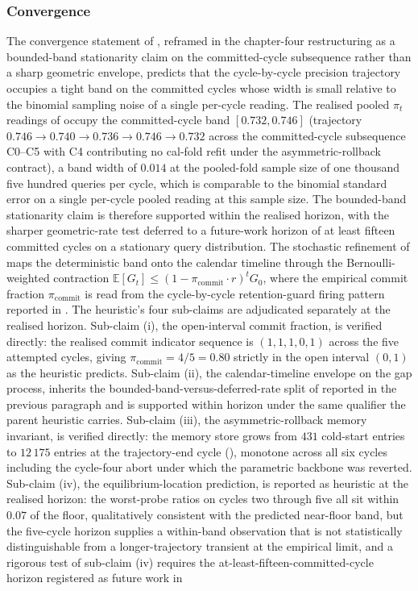 \subsubsection{Convergence}
\label{sec:check-convergence}

The convergence statement of , reframed in the chapter-four restructuring as a bounded-band stationarity claim on the committed-cycle subsequence rather than a sharp geometric envelope, predicts that the cycle-by-cycle precision trajectory occupies a tight band on the committed cycles whose width is small relative to the binomial sampling noise of a single per-cycle reading. The realised pooled $\pi_t$ readings of  occupy the committed-cycle band $[0.732, 0.746]$ (trajectory $0.746 \to 0.740 \to 0.736 \to 0.746 \to 0.732$ across the committed-cycle subsequence C0--C5 with C4 contributing no cal-fold refit under the asymmetric-rollback contract), a band width of $0.014$ at the pooled-fold sample size of one thousand five hundred queries per cycle, which is comparable to the binomial standard error on a single per-cycle pooled reading at this sample size. The bounded-band stationarity claim is therefore supported within the realised horizon, with the sharper geometric-rate test deferred to a future-work horizon of at least fifteen committed cycles on a stationary query distribution. The stochastic refinement of  maps the deterministic band onto the calendar timeline through the Bernoulli-weighted contraction $\mathbb{E}[G_t] \le (1 - \pi_{\mathrm{commit}} \cdot r)^t G_0$, where the empirical commit fraction $\pi_{\mathrm{commit}}$ is read from the cycle-by-cycle retention-guard firing pattern reported in . The heuristic's four sub-claims are adjudicated separately at the realised horizon. Sub-claim (i), the open-interval commit fraction, is verified directly: the realised commit indicator sequence is $(1, 1, 1, 0, 1)$ across the five attempted cycles, giving $\pi_{\mathrm{commit}} = 4/5 = 0.80$ strictly in the open interval $(0, 1)$ as the heuristic predicts. Sub-claim (ii), the calendar-timeline envelope on the gap process, inherits the bounded-band-versus-deferred-rate split of  reported in the previous paragraph and is supported within horizon under the same qualifier the parent heuristic carries. Sub-claim (iii), the asymmetric-rollback memory invariant, is verified directly: the memory store grows from $431$ cold-start entries to $12\,175$ entries at the trajectory-end cycle (), monotone across all six cycles including the cycle-four abort under which the parametric backbone was reverted. Sub-claim (iv), the equilibrium-location prediction, is reported as heuristic at the realised horizon: the worst-probe ratios on cycles two through five all sit within $0.07$ of the floor, qualitatively consistent with the predicted near-floor band, but the five-cycle horizon supplies a within-band observation that is not statistically distinguishable from a longer-trajectory transient at the empirical limit, and a rigorous test of sub-claim (iv) requires the at-least-fifteen-committed-cycle horizon registered as future work in 